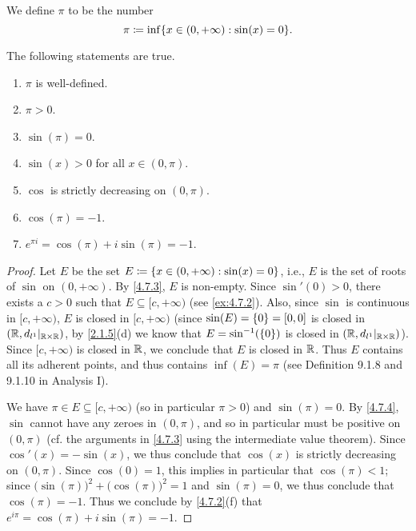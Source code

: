 \begin{defn}\label{4.7.4}
  We define \(\pi\) to be the number
  \[
    \pi \coloneqq \inf\set{x \in (0, +\infty) : \sin(x) = 0}.
  \]
\end{defn}

\begin{ac}\label{ac:4.7.2}
  The following statements are true.
  \begin{enumerate}
    \item \(\pi\) is well-defined.
    \item \(\pi > 0\).
    \item \(\sin(\pi) = 0\).
    \item \(\sin(x) > 0\) for all \(x \in (0, \pi)\).
    \item \(\cos\) is strictly decreasing on \((0, \pi)\).
    \item \(\cos(\pi) = -1\).
    \item \(e^{\pi i} = \cos(\pi) + i \sin(\pi) = -1\).
  \end{enumerate}
\end{ac}

\begin{proof}
  Let \(E\) be the set \(E \coloneqq \left\lbrace x \in (0, +\infty) : \sin(x) = 0\right\rbrace\), i.e., \(E\) is the set of roots of \(\sin\) on \((0, +\infty)\).
  By \cref{4.7.3}, \(E\) is non-empty.
  Since \(\sin'(0) > 0\), there exists a \(c > 0\) such that \(E \subseteq [c, +\infty)\) (see \cref{ex:4.7.2}).
  Also, since \(\sin\) is continuous in \([c, +\infty)\), \(E\) is closed in \([c, +\infty)\)
  (since \(\sin(E) = \left\lbrace0\right\rbrace = [0, 0]\) is closed in \((\mathbb{R}, d_{l^1}|_{\mathbb{R} \times \mathbb{R}})\), by \cref{2.1.5}(d) we know that \(E = \sin^{-1}(\left\lbrace0\right\rbrace)\) is closed in \((\mathbb{R}, d_{l^1}|_{\mathbb{R} \times \mathbb{R}})\)).
  Since \([c, +\infty)\) is closed in \(\mathbb{R}\), we conclude that \(E\) is closed in \(\mathbb{R}\).
  Thus \(E\) contains all its adherent points, and thus contains \(\inf(E) = \pi\) (see Definition 9.1.8 and 9.1.10 in Analysis I).

  We have \(\pi \in E \subseteq [c, +\infty)\) (so in particular \(\pi > 0\)) and \(\sin(\pi) = 0\).
  By \cref{4.7.4}, \(\sin\) cannot have any zeroes in \((0, \pi)\), and so in particular must be positive on \((0, \pi)\)
  (cf. the arguments in \cref{4.7.3} using the intermediate value theorem).
  Since \(\cos'(x) = -\sin(x)\), we thus conclude that \(\cos(x)\) is strictly decreasing on \((0, \pi)\).
  Since \(\cos(0) = 1\), this implies in particular that \(\cos(\pi) < 1\);
  since \(\big(\sin(\pi)\big)^2 + \big(\cos(\pi)\big)^2 = 1\) and \(\sin(\pi) = 0\), we thus conclude that \(\cos(\pi) = -1\).
  Thus we conclude by \cref{4.7.2}(f) that \(e^{i \pi} = \cos(\pi) + i \sin(\pi) = -1\).
\end{proof}

